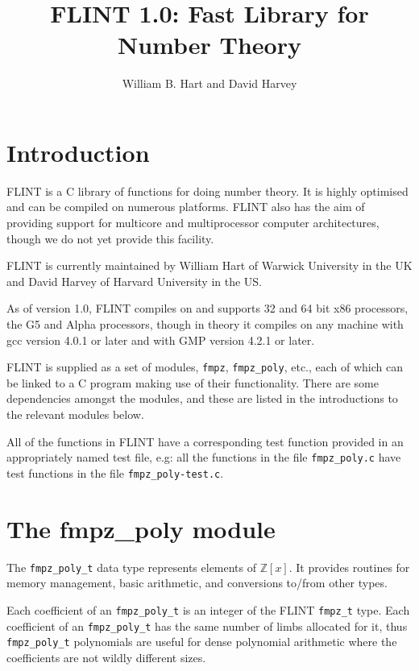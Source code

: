 \documentclass[a4paper,10pt]{article}
\title{FLINT 1.0: Fast Library for Number Theory}
\author{William B. Hart and David Harvey}
\newcommand{\Z}{\mathbb{Z}}
\newcommand{\code}{\lstinline}
\begin{document}
\maketitle
\lstset{language=c}
\lstset{basicstyle=\ttfamily}
\lstset{keywordstyle=}
\lstset{escapeinside=\%\%}

\section{Introduction}

FLINT is a C library of functions for doing number theory. It is highly optimised and can be compiled on numerous platforms. FLINT also has the aim of providing support for multicore and multiprocessor computer architectures, though we do not yet provide this facility.

FLINT is currently maintained by William Hart of Warwick University in the UK and David Harvey of Harvard University in the US.

As of version 1.0, FLINT compiles on and supports 32 and 64 bit x86 processors, the G5 and Alpha processors, though in theory it compiles on any machine with gcc version 4.0.1 or later and with GMP version 4.2.1 or later.

FLINT is supplied as a set of modules, \code{fmpz}, \code{fmpz_poly}, etc., each of which can be linked to a C program making use of their functionality. There are some dependencies amongst the modules, and these are listed in the introductions to the relevant modules below.

All of the functions in FLINT have a corresponding test function provided in an appropriately named test file, e.g: all the functions in the file \code{fmpz_poly.c} have test functions in the file \code{fmpz_poly-test.c}.

\section{The fmpz\_poly module}

The \code{fmpz_poly_t} data type represents elements of $\Z[x]$. It provides routines for memory management, basic arithmetic, and conversions to/from other types.

Each coefficient of an \code{fmpz_poly_t} is an integer of the FLINT \code{fmpz_t} type. Each coefficient of an \code{fmpz_poly_t} has the same number of limbs allocated for it, thus \code{fmpz_poly_t} polynomials are useful for dense polynomial arithmetic where the coefficients are not wildly different sizes.
\end{document}
